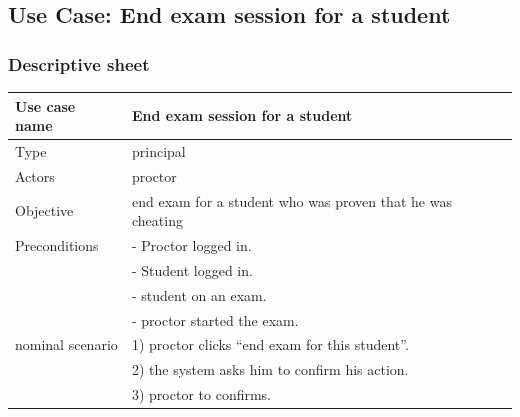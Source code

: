 \documentclass[]{uc2pfecaneva}
\begin{document}
	\thispagestyle{empty}
	\begin{table}[h]
	\raggedright\subsection{Use Case: End exam session for a student}
	\subsubsection{Descriptive sheet}
	\centering
	\begin{tabularx}{\textwidth}{|l|X|}
		\hline
		Use case name         & End exam session for a student                                                                                                 \\ \hline
		Type                  & principal                                                                                                              \\ \hline
		Actors                & proctor                                                                                                                \\ \hline
		Objective             & end exam for a student who was proven that he was cheating                                                             \\ \hline
		Preconditions
		                      & - Proctor logged in.                                                                                                   \\
		                      & - Student logged in.                                                                                                   \\
		                      & - student on an exam.                                                                                                  \\
		                      & - proctor started the exam.                                                                                            \\ \hline
		nominal scenario
		                      & 1) proctor clicks “end exam for this student”.                                                                         \\
		                      & 2) the system asks him to confirm his action.                                                                          \\
		                      & 3) proctor to confirms.                                                                                                \\

\end{tabularx}
\end{table}
\end{document}

